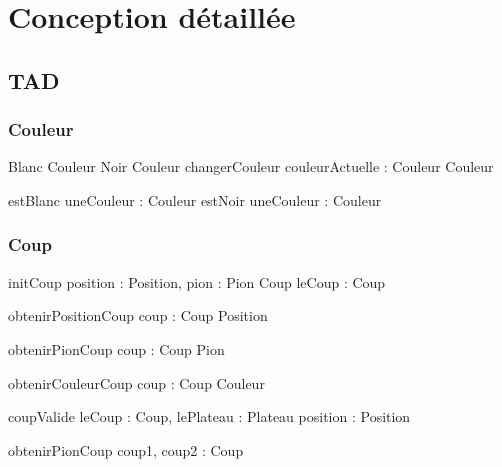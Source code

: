 
\section{Conception détaillée}
\subsection{TAD}
\subsubsection{Couleur}
\begin{algorithme}

	\fonction 
	{Blanc}
	{}
	{Couleur}
	{}
	{}
	\fonction 
	{Noir}
	{}
	{Couleur}
	{}
	{}
	\fonction
	{changerCouleur}
	{couleurActuelle : Couleur}
	{Couleur}
	{}
	{
			{
			}
			
	}
	\fonction
	{estBlanc}
	{uneCouleur : Couleur}
	{\booleen}
	{}
	{
		{
	}
{
}
}
	\fonction
	{estNoir}
	{uneCouleur : Couleur}
	{\booleen}
	{}
	{
		{
		}
		{
	}}

\end{algorithme}

\subsubsection{Coup}
\begin{algorithme}
	\fonction 
	{initCoup}
	{position : Position, pion : Pion}
	{Coup}
	{leCoup : Coup}
	{
	}

	
	\fonction 
	{obtenirPositionCoup}
	{coup : Coup}
	{Position}
	{}
	{}
	
	\fonction 
	{obtenirPionCoup}
	{coup : Coup}
	{Pion}
	{}
	{}
	
	\fonction 
	{obtenirCouleurCoup}
	{coup : Coup}
	{Couleur}
	{}
	{}
	
	
	\fonction 
{coupValide}
{leCoup : Coup, lePlateau : Plateau}
{\booleen}
{position : Position}
{
	
}


\fonction 
{obtenirPionCoup}
{coup1, coup2 : Coup}
{\booleen}
{}
{
}

\end{algorithme}

